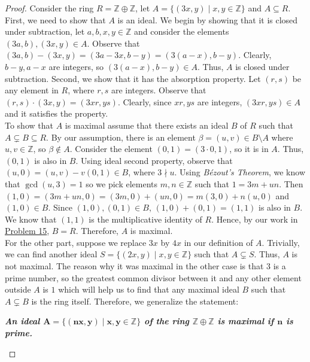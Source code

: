 \documentclass[a4paper,12pt]{article}
\begin{document}
\begin{proof}
  Consider the ring $R=\mathbb{Z}\oplus \mathbb{Z}$, let $A = \{(3x,y) \mid x,y \in \mathbb{Z}\}$ and $A \subseteq R.$ First, we need to show that $A$ is an ideal. We begin by showing that it is closed under subtraction, let $a,b,x,y \in \mathbb{Z}$ and consider the elements $(3a,b), (3x,y) \in A.$ Observe that $(3a,b)-(3x,y)=(3a-3x, b-y)=(3(a-x), b-y)$. Clearly, $b-y, a-x$ are integers, so $(3(a-x), b-y)\in A$. Thus, $A$ is closed under subtraction. Second, we show that it has the absorption property. Let $(r,s)$ be any element in $R$, where $r,s$ are integers. Observe that $(r,s) \cdot (3x,y)=(3xr, ys)$. Clearly, since $xr, ys$ are integers, $(3xr, ys) \in A$ and it satisfies the property. 
  \\ To show that $A$ is maximal assume that there exists an ideal $B$ of $R$ such that $A \subsetneq B \subseteq R.$ By our assumption, there is an element $\beta =(u,v) \in B\setminus A$ where $u,v \in \mathbb{Z}$, so $\beta \notin A.$
    Consider the element $(0,1)=(3\cdot 0, 1)$, so it is in $A$. Thus, $(0,1)$ is also in $B.$ Using ideal second property, observe that $(u,0)=(u,v)-v(0,1) \in B$, where $3 \nmid u.$ Using \textit{Bézout's Theorem}, we know that $\operatorname{gcd}(u,3)=1$ so we pick elements $m,n \in \mathbb{Z}$ such that $1=3m+un.$ Then $(1,0)=(3m+un,0)=(3m,0)+(un,0)=m(3,0)+n(u,0)$ and $(1,0) \in B.$ Since $(1,0), (0,1) \in B$, $(1,0)+(0,1)=(1,1)$ is also in $B$. We know that $(1,1)$ is the multiplicative identity of $R$. Hence, by our work in \hyperref[sec:prob15]{Problem 15}, $B=R.$ Therefore, $A$ is maximal.\\
    For the other part, suppose we replace $3x$ by $4x$ in our definition of $A.$ Trivially, we can find another ideal $S=\{(2x,y) \mid x,y \in \mathbb{Z}\}$ such that $A \subsetneq S.$ Thus, $A$ is not maximal. The reason why it was maximal in the other case is that $3$ is a prime number, so the greatest common divisor between it and any other element outside $A$ is $1$ which will help us to find that any maximal ideal $B$ such that $A \subsetneq B$ is the ring itself. Therefore, we generalize the statement:
    \begin{center}
        \textit{\textbf{An ideal $\bm{A=\{(nx,y) \mid x,y \in \mathbb{Z}\}}$ of the ring $\bm{\mathbb{Z}\oplus \mathbb{Z}}$ is maximal if $\bm{n}$ is prime.}}
    \end{center}
\end{proof}
\end{document}
